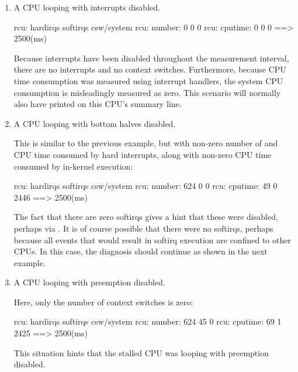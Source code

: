 \begin{enumerate}
\item A CPU looping with interrupts disabled.

\begin{VerbatimU}
     rcu:          hardirqs   softirqs   csw/system
     rcu:  number:        0          0            0
     rcu: cputime:        0          0            0   ==> 2500(ms)
\end{VerbatimU}

   Because interrupts have been disabled throughout the measurement
   interval, there are no interrupts and no context switches.
   Furthermore, because CPU time consumption was measured using interrupt
   handlers, the system CPU consumption is misleadingly measured as zero.
   This scenario will normally also have  printed on
   this CPU's summary line.

\item A CPU looping with bottom halves disabled.

   This is similar to the previous example, but with non-zero number of
   and CPU time consumed by hard interrupts, along with non-zero CPU
   time consumed by in-kernel execution:

\begin{VerbatimU}
     rcu:          hardirqs   softirqs   csw/system
     rcu:  number:      624          0            0
     rcu: cputime:       49          0         2446   ==> 2500(ms)
\end{VerbatimU}

   The fact that there are zero softirqs gives a hint that these were
   disabled, perhaps via .
   It is of course possible
   that there were no softirqs, perhaps because all events that would
   result in softirq execution are confined to other CPUs.
   In this case,
   the diagnosis should continue as shown in the next example.

\item A CPU looping with preemption disabled.

   Here, only the number of context switches is zero:

\begin{VerbatimU}
     rcu:          hardirqs   softirqs   csw/system
     rcu:  number:      624         45            0
     rcu: cputime:       69          1         2425   ==> 2500(ms)
\end{VerbatimU}

   This situation hints that the stalled CPU was looping with preemption
   disabled.


\end{enumerate}
